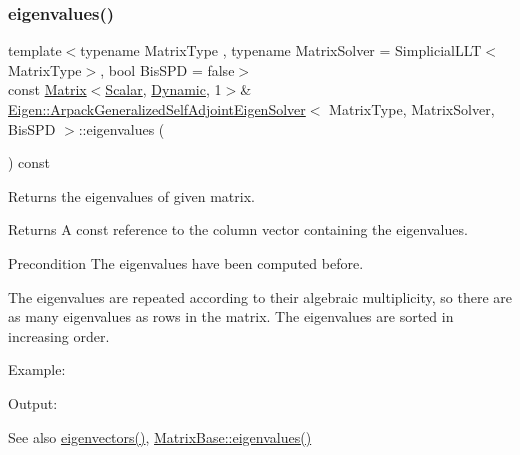\subsubsection{\texorpdfstring{eigenvalues()}{eigenvalues()}\hspace{0.1cm}{\footnotesize\ttfamily [1/2]}}
{\footnotesize\ttfamily template$<$typename Matrix\+Type , typename Matrix\+Solver  = Simplicial\+L\+L\+T$<$\+Matrix\+Type$>$, bool Bis\+S\+PD = false$>$ \\
const \hyperlink{group___core___module_class_eigen_1_1_matrix}{Matrix}$<$\hyperlink{class_eigen_1_1_arpack_generalized_self_adjoint_eigen_solver_ab1182405bfe87a505d4b7a8311c661ec}{Scalar}, \hyperlink{namespace_eigen_ad81fa7195215a0ce30017dfac309f0b2}{Dynamic}, 1$>$\& \hyperlink{class_eigen_1_1_arpack_generalized_self_adjoint_eigen_solver}{Eigen\+::\+Arpack\+Generalized\+Self\+Adjoint\+Eigen\+Solver}$<$ Matrix\+Type, Matrix\+Solver, Bis\+S\+PD $>$\+::eigenvalues (\begin{DoxyParamCaption}{ }\end{DoxyParamCaption}) const\hspace{0.3cm}{\ttfamily [inline]}}



Returns the eigenvalues of given matrix. 

\begin{DoxyReturn}{Returns}
A const reference to the column vector containing the eigenvalues.
\end{DoxyReturn}
\begin{DoxyPrecond}{Precondition}
The eigenvalues have been computed before.
\end{DoxyPrecond}
The eigenvalues are repeated according to their algebraic multiplicity, so there are as many eigenvalues as rows in the matrix. The eigenvalues are sorted in increasing order.

Example\+: 
\begin{DoxyCodeInclude}
\end{DoxyCodeInclude}
 Output\+: 
\begin{DoxyVerbInclude}
\end{DoxyVerbInclude}


\begin{DoxySeeAlso}{See also}
\hyperlink{class_eigen_1_1_arpack_generalized_self_adjoint_eigen_solver_a183825135568364792a955efc55a0773}{eigenvectors()}, \hyperlink{group___core___module_a30430fa3d5b4e74d312fd4f502ac984d}{Matrix\+Base\+::eigenvalues()} 
\end{DoxySeeAlso}


